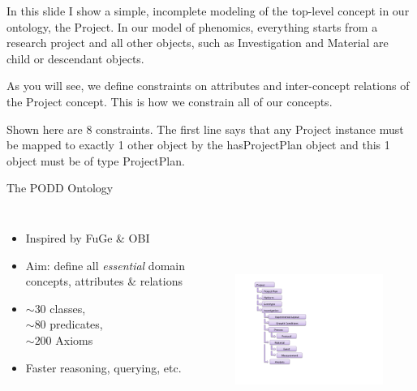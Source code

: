 \documentclass[ignorenonframetext,compress]{beamer}
\begin{document}
In this slide I show a simple, incomplete modeling of the top-level concept
in our ontology, the Project. In our model of phenomics, everything starts 
from a research project and all other objects, such as Investigation and
Material are child or descendant objects. 

As you will see, we define constraints on attributes and inter-concept relations
of the Project concept. This is how we constrain all of our concepts.

Shown here are 8 constraints. The first line says that any Project instance must
be mapped to exactly 1 other object by the hasProjectPlan object and this 1 object
must be of type ProjectPlan.

\begin{frame}{The PODD Ontology}
\begin{columns}[t]
\begin{itemize}
    \item Inspired by FuGe \& OBI
    \item Aim: define all \emph{essential} domain concepts, attributes \& relations
    \item $\sim30$ classes, \\$\sim 80$ predicates, \\$\sim 200$ Axioms
    \item Faster reasoning, querying, etc.
\end{itemize}
\vfill
{}
\vspace{-10mm}
 \begin{figure}[t]
  \begin{center}
  \includegraphics[trim=3mm 26mm 2mm 8mm, clip, height=72mm]{hier.pdf}
   \end{center}
 \end{figure}
\end{columns}
\end{frame}
\end{document}
